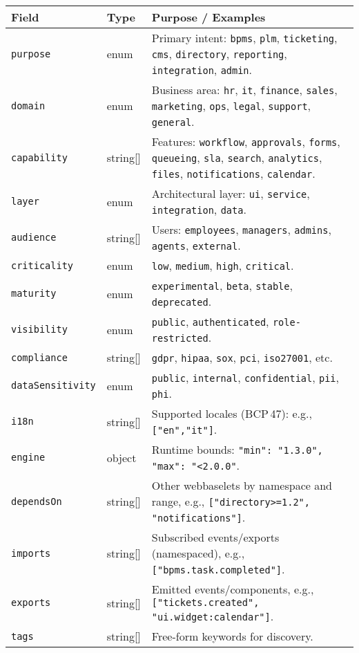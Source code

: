 \begin{tabularx}{\linewidth}{@{}l l X@{}}
  \textbf{Field} & \textbf{Type} & \textbf{Purpose / Examples} \\
\hline
  \texttt{purpose} & enum & Primary intent: \texttt{bpms}, \texttt{plm}, \texttt{ticketing}, \texttt{cms}, \texttt{directory}, \texttt{reporting}, \texttt{integration}, \texttt{admin}. \\
  \texttt{domain} & enum & Business area: \texttt{hr}, \texttt{it}, \texttt{finance}, \texttt{sales}, \texttt{marketing}, \texttt{ops}, \texttt{legal}, \texttt{support}, \texttt{general}. \\
  \texttt{capability} & string[] & Features: \texttt{workflow}, \texttt{approvals}, \texttt{forms}, \texttt{queueing}, \texttt{sla}, \texttt{search}, \texttt{analytics}, \texttt{files}, \texttt{notifications}, \texttt{calendar}. \\
  \texttt{layer} & enum & Architectural layer: \texttt{ui}, \texttt{service}, \texttt{integration}, \texttt{data}. \\
  \texttt{audience} & string[] & Users: \texttt{employees}, \texttt{managers}, \texttt{admins}, \texttt{agents}, \texttt{external}. \\
  \texttt{criticality} & enum & \texttt{low}, \texttt{medium}, \texttt{high}, \texttt{critical}. \\
  \texttt{maturity} & enum & \texttt{experimental}, \texttt{beta}, \texttt{stable}, \texttt{deprecated}. \\
  \texttt{visibility} & enum & \texttt{public}, \texttt{authenticated}, \texttt{role-restricted}. \\
  \texttt{compliance} & string[] & \texttt{gdpr}, \texttt{hipaa}, \texttt{sox}, \texttt{pci}, \texttt{iso27001}, etc. \\
  \texttt{dataSensitivity} & enum & \texttt{public}, \texttt{internal}, \texttt{confidential}, \texttt{pii}, \texttt{phi}. \\
  \texttt{i18n} & string[] & Supported locales (BCP\,47): e.g., \texttt{["en","it"]}. \\
  \texttt{engine} & object & Runtime bounds: \texttt{{"min": "1.3.0", "max": "<2.0.0"}}. \\
  \texttt{dependsOn} & string[] & Other webbaselets by namespace and range, e.g., \texttt{["directory>=1.2", "notifications"]}. \\
  \texttt{imports} & string[] & Subscribed events/exports (namespaced), e.g., \texttt{["bpms.task.completed"]}. \\
  \texttt{exports} & string[] & Emitted events/components, e.g., \texttt{["tickets.created", "ui.widget:calendar"]}. \\
  \texttt{tags} & string[] & Free-form keywords for discovery. \\
\end{tabularx}

